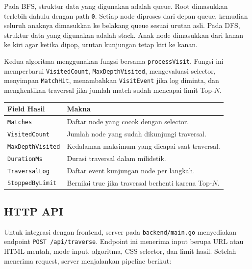 Pada BFS, struktur data yang digunakan adalah queue. Root dimasukkan terlebih dahulu dengan path \texttt{0}. Setiap node diproses dari depan queue, kemudian seluruh anaknya dimasukkan ke belakang queue sesuai urutan asli. Pada DFS, struktur data yang digunakan adalah stack. Anak node dimasukkan dari kanan ke kiri agar ketika dipop, urutan kunjungan tetap kiri ke kanan.

Kedua algoritma menggunakan fungsi bersama \texttt{processVisit}. Fungsi ini memperbarui \texttt{VisitedCount}, \texttt{MaxDepthVisited}, mengevaluasi selector, menyimpan \texttt{MatchHit}, menambahkan \texttt{VisitEvent} jika log diminta, dan menghentikan traversal jika jumlah match sudah mencapai limit Top-$N$.

\begin{table}[H]
\centering
\small
\begin{tabular}{|p{}|p{}|}
    \hline
    \textbf{Field Hasil} & \textbf{Makna} \\
    \hline
    \texttt{Matches} & Daftar node yang cocok dengan selector. \\
    \hline
    \texttt{VisitedCount} & Jumlah node yang sudah dikunjungi traversal. \\
    \hline
    \texttt{MaxDepthVisited} & Kedalaman maksimum yang dicapai saat traversal. \\
    \hline
    \texttt{DurationMs} & Durasi traversal dalam milidetik. \\
    \hline
    \texttt{TraversalLog} & Daftar event kunjungan node per langkah. \\
    \hline
    \texttt{StoppedByLimit} & Bernilai true jika traversal berhenti karena Top-$N$. \\
    \hline
\end{tabular}
\end{table}

\subsection{HTTP API}

Untuk integrasi dengan frontend, server pada \texttt{backend/main.go} menyediakan endpoint \texttt{POST /api/traverse}. Endpoint ini menerima input berupa URL atau HTML mentah, mode input, algoritma, CSS selector, dan limit hasil. Setelah menerima request, server menjalankan pipeline berikut:

